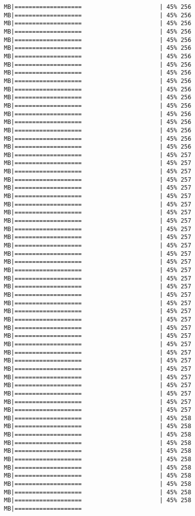 \documentclass[
]{article}
\begin{document}
\begin{verbatim}
MB|===================                      | 45% 256 MB|===================                      | 45% 256 MB|===================                      | 45% 256 MB|===================                      | 45% 256 MB|===================                      | 45% 256 MB|===================                      | 45% 256 MB|===================                      | 45% 256 MB|===================                      | 45% 256 MB|===================                      | 45% 256 MB|===================                      | 45% 256 MB|===================                      | 45% 256 MB|===================                      | 45% 256 MB|===================                      | 45% 256 MB|===================                      | 45% 256 MB|===================                      | 45% 256 MB|===================                      | 45% 256 MB|===================                      | 45% 256 MB|===================                      | 45% 256 MB|===================                      | 45% 257 MB|===================                      | 45% 257 MB|===================                      | 45% 257 MB|===================                      | 45% 257 MB|===================                      | 45% 257 MB|===================                      | 45% 257 MB|===================                      | 45% 257 MB|===================                      | 45% 257 MB|===================                      | 45% 257 MB|===================                      | 45% 257 MB|===================                      | 45% 257 MB|===================                      | 45% 257 MB|===================                      | 45% 257 MB|===================                      | 45% 257 MB|===================                      | 45% 257 MB|===================                      | 45% 257 MB|===================                      | 45% 257 MB|===================                      | 45% 257 MB|===================                      | 45% 257 MB|===================                      | 45% 257 MB|===================                      | 45% 257 MB|===================                      | 45% 257 MB|===================                      | 45% 257 MB|===================                      | 45% 257 MB|===================                      | 45% 257 MB|===================                      | 45% 257 MB|===================                      | 45% 257 MB|===================                      | 45% 257 MB|===================                      | 45% 257 MB|===================                      | 45% 257 MB|===================                      | 45% 257 MB|===================                      | 45% 257 MB|===================                      | 45% 258 MB|===================                      | 45% 258 MB|===================                      | 45% 258 MB|===================                      | 45% 258 MB|===================                      | 45% 258 MB|===================                      | 45% 258 MB|===================                      | 45% 258 MB|===================                      | 45% 258 MB|===================                      | 45% 258 MB|===================                      | 45% 258 MB|===================                      | 45% 258 MB|===================   
\end{verbatim}
\end{document}
